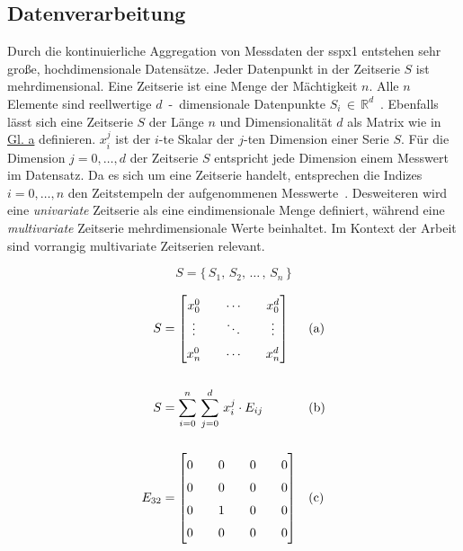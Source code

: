 \subsection{Datenverarbeitung}\label{sec:datenverarbeitung}
Durch die kontinuierliche Aggregation von Messdaten der \ac{sspx1} entstehen sehr große, hochdimensionale Datensätze. Jeder Datenpunkt in
der Zeitserie $S$ ist mehrdimensional. Eine Zeitserie ist eine Menge der Mächtigkeit $n$. Alle $n$ Elemente sind reellwertige
$d$~-~dimensionale Datenpunkte $S_i\,\in\,\mathbb{R}^{d}$~\cite{Schmidl2022}. Ebenfalls lässt sich eine Zeitserie $S$ der Länge $n$ und
Dimensionalität $d$ als Matrix wie in \hyperref[eq:timeseries_matrix_sum]{Gl. a} definieren. $x_{i}^{j}$ ist
der $i$-te Skalar der $j$-ten Dimension einer Serie $S$. Für die Dimension $j={0,\dots,d}$ der Zeitserie $S$ entspricht jede Dimension
einem Messwert im Datensatz. Da es sich um eine Zeitserie handelt, entsprechen die Indizes $i={0, \dots, n}$ den Zeitstempeln der
aufgenommenen Messwerte~\cite{Wenig2024}. Desweiteren wird eine \textit{univariate} Zeitserie als eine eindimensionale Menge definiert,
während eine \textit{multivariate} Zeitserie mehrdimensionale Werte beinhaltet. Im Kontext der Arbeit sind vorrangig multivariate
Zeitserien relevant.

\begin{equation}
    S=\{\,S_1,\,S_2,\,\dots\,,\,S_n\,\}\label{eq:timeseries_set}
\end{equation}

\begin{equation}
    \setcounter{equation}{1}
        \begin{subequations}
        \setlength{\arraycolsep}{1em}
        \renewcommand{\arraystretch}{1.5}
        \begin{aligned}
            S &=
            \begin{bmatrix} 
                x_{0}^{0} & \cdots & x_{0}^{d} \\
                \vdots & \ddots & \vdots \\
                x_{n}^{0} & \cdots & x_{n}^{d} 
            \end{bmatrix} 
            && \text{(a)} \\[1.5em]
            S &= \sum_{i=0}^{n}\,\sum_{j=0}^{d}\,x_{i}^{j} \cdot E_{ij}
            && \text{(b)}\\[1.5em]
            E_{32} &=
            \begin{bmatrix}
                0 & 0 & 0 & 0 \\
                0 & 0 & 0 & 0 \\
                0 & 1 & 0 & 0 \\
                0 & 0 & 0 & 0 \\
            \end{bmatrix}
            && \text{(c)} \\[1.5em]
        \end{aligned}
    \end{subequations}
\label{eq:timeseries_matrix_sum}
\end{equation}

